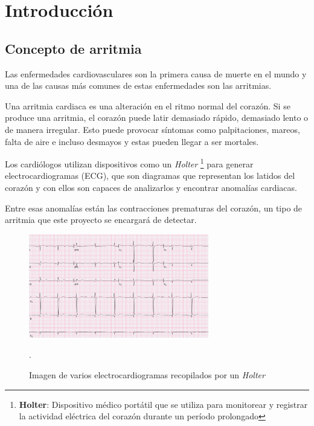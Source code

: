 \titlespacing*{\chapter}{0pt}{-1.25cm}{25pt}
\chapter{Introducción}
\section{Concepto de arritmia}
Las enfermedades cardiovasculares son la primera causa de muerte en el mundo y una de las causas más comunes de estas enfermedades son las arritmias.

Una arritmia cardiaca es una alteración en el ritmo normal del corazón. Si se produce una arritmia, el corazón puede latir demasiado rápido, demasiado lento o de manera irregular. Esto puede provocar síntomas como palpitaciones, mareos, falta de aire e incluso desmayos y estas pueden llegar a ser mortales.

Los cardiólogos utilizan dispositivos como un \textit{Holter} \footnote{\textbf{Holter}: Dispositivo médico portátil que se utiliza para monitorear y registrar la actividad eléctrica del corazón durante un período prolongado} para generar electrocardiogramas (ECG), que son diagramas que representan los latidos del corazón y con ellos son capaces de analizarlos y encontrar anomalías cardiacas.

Entre esas anomalías están las contracciones prematuras del corazón, un tipo de arritmia que este proyecto se encargará de detectar. 

\begin{figure}[h!]
	\centering
	\includegraphics[width=0.7\textwidth]{./Images/img_introduccion/electrocardiograma.png}
	\caption{Imagen de varios electrocardiogramas recopilados por un \textit{Holter} \cite{fotoElectrocardiograma}}.
	\label{fig:electrocardiogramas}
\end{figure}

